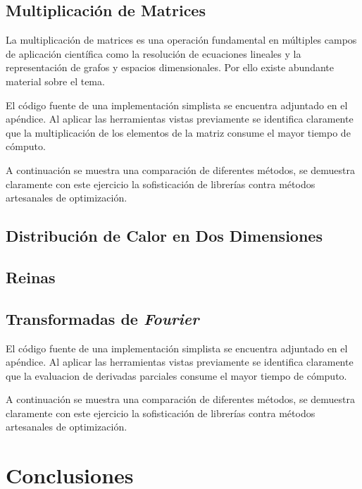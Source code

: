 \documentclass[a4paper]{report}
\begin{document}
\section{Multiplicaci\'on de Matrices}

La multiplicaci\'on de matrices es una operaci\'on fundamental en m\'ultiples campos
de aplicaci\'on cient\'ifica como la resoluci\'on de ecuaciones lineales y la
representaci\'on de grafos y espacios dimensionales. Por ello existe abundante
 material sobre el tema.

\bigskip

El c\'odigo fuente de una implementaci\'on simplista se encuentra adjuntado en el
ap\'endice. Al aplicar las herramientas vistas previamente se identifica claramente
que la multiplicaci\'on de los elementos de la matriz consume el mayor tiempo de
c\'omputo.

\bigskip

A continuaci\'on se muestra una comparaci\'on de diferentes m\'etodos, se demuestra
claramente con este ejercicio la sofisticaci\'on de librer\'ias contra m\'etodos
artesanales de optimizaci\'on.

\section{Distribuci\'on de Calor en Dos Dimensiones}

\section{Reinas}

\section{Transformadas de {\it Fourier}}

El c\'odigo fuente de una implementaci\'on simplista se encuentra adjuntado en el
ap\'endice. Al aplicar las herramientas vistas previamente se identifica claramente
que la evaluacion de derivadas parciales consume el mayor tiempo de c\'omputo.

\bigskip

A continuaci\'on se muestra una comparaci\'on de diferentes m\'etodos, se demuestra
claramente con este ejercicio la sofisticaci\'on de librer\'ias contra m\'etodos
artesanales de optimizaci\'on.

\chapter{Conclusiones}
\end{document}
